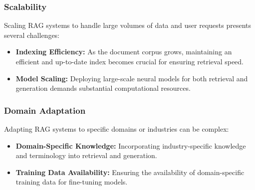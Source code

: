 \subsubsection*{Scalability}

Scaling RAG systems to handle large volumes of data and user requests presents several challenges:

\begin{itemize}
    \item \textbf{Indexing Efficiency:} As the document corpus grows, maintaining an efficient and up-to-date index becomes crucial for ensuring retrieval speed.

    \item \textbf{Model Scaling:} Deploying large-scale neural models for both retrieval and generation demands substantial computational resources.
\end{itemize}

\subsubsection*{Domain Adaptation}

Adapting RAG systems to specific domains or industries can be complex:

\begin{itemize}
    \item \textbf{Domain-Specific Knowledge:} Incorporating industry-specific knowledge and terminology into retrieval and generation.

    \item \textbf{Training Data Availability:} Ensuring the availability of domain-specific training data for fine-tuning models.
\end{itemize}